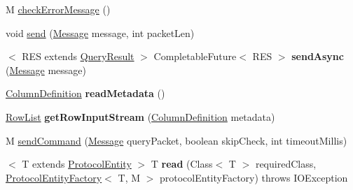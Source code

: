 \begin{DoxyCompactItemize}
\item 
M \mbox{\hyperlink{interfacecom_1_1mysql_1_1cj_1_1protocol_1_1_protocol_a7176330712bc7aa3ba67261d4a8ef0ca}{check\+Error\+Message}} ()
\item 
void \mbox{\hyperlink{interfacecom_1_1mysql_1_1cj_1_1protocol_1_1_protocol_ae917ec7bc23dc3244bea8e745318c725}{send}} (\mbox{\hyperlink{interfacecom_1_1mysql_1_1cj_1_1protocol_1_1_message}{Message}} message, int packet\+Len)
\item 
\mbox{\label{interfacecom_1_1mysql_1_1cj_1_1protocol_1_1_protocol_aa26c38c00e4f25607756ad93288603df}} 
$<$ R\+ES extends \mbox{\hyperlink{interfacecom_1_1mysql_1_1cj_1_1_query_result}{Query\+Result}} $>$ Completable\+Future$<$ R\+ES $>$ {\bfseries send\+Async} (\mbox{\hyperlink{interfacecom_1_1mysql_1_1cj_1_1protocol_1_1_message}{Message}} message)
\item 
\mbox{\label{interfacecom_1_1mysql_1_1cj_1_1protocol_1_1_protocol_a65f8a3d80ead4cf22ffe65c539f2f851}} 
\mbox{\hyperlink{interfacecom_1_1mysql_1_1cj_1_1protocol_1_1_column_definition}{Column\+Definition}} {\bfseries read\+Metadata} ()
\item 
\mbox{\label{interfacecom_1_1mysql_1_1cj_1_1protocol_1_1_protocol_a9e859d7ef531819c5bdef288f650ab83}} 
\mbox{\hyperlink{interfacecom_1_1mysql_1_1cj_1_1result_1_1_row_list}{Row\+List}} {\bfseries get\+Row\+Input\+Stream} (\mbox{\hyperlink{interfacecom_1_1mysql_1_1cj_1_1protocol_1_1_column_definition}{Column\+Definition}} metadata)
\item 
M \mbox{\hyperlink{interfacecom_1_1mysql_1_1cj_1_1protocol_1_1_protocol_aaef9b7f93e895f19b2f6bc13ec5c2295}{send\+Command}} (\mbox{\hyperlink{interfacecom_1_1mysql_1_1cj_1_1protocol_1_1_message}{Message}} query\+Packet, boolean skip\+Check, int timeout\+Millis)
\item 
\mbox{\label{interfacecom_1_1mysql_1_1cj_1_1protocol_1_1_protocol_a48ee5ee3c590b73b47b2094694730319}} 
$<$ T extends \mbox{\hyperlink{interfacecom_1_1mysql_1_1cj_1_1protocol_1_1_protocol_entity}{Protocol\+Entity}} $>$ T {\bfseries read} (Class$<$ T $>$ required\+Class, \mbox{\hyperlink{interfacecom_1_1mysql_1_1cj_1_1protocol_1_1_protocol_entity_factory}{Protocol\+Entity\+Factory}}$<$ T, M $>$ protocol\+Entity\+Factory)  throws I\+O\+Exception

\end{DoxyCompactItemize}
